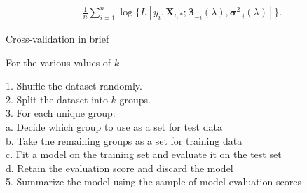 \begin{align*}
\frac{1}{n} \sum_{i = 1}^n \log\{L[y_i, \mathbf{X}_{i, \ast}; \boldsymbol{\beta}_{-i}(\lambda), \boldsymbol{\sigma}_{-i}^2(\lambda)]\}.
\end{align*}

%

Cross-validation in brief

For the various values of $k$

\begin{mdframed}[backgroundcolor=black!10]
\raggedright

1. Shuffle the dataset randomly.\\

2. Split the dataset into $k$ groups.\\

3. For each unique group:\\

\hspace{1cm}a. Decide which group to use as a set for test data\\

\hspace{1cm}b. Take the remaining groups as a set for training data\\

\hspace{1cm}c. Fit a model on the training set and evaluate it on the test set\\

\hspace{1cm}d. Retain the evaluation score and discard the model\\

5. Summarize the model using the sample of model evaluation scores\\

\end{mdframed}


